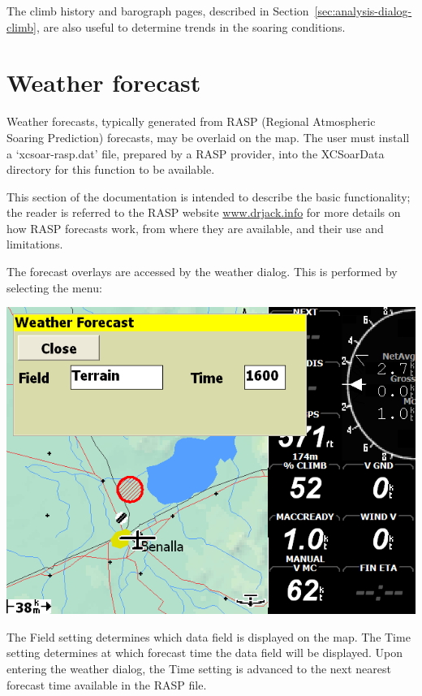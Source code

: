 \documentclass[a4paper,12pt]{refrep}
\begin{document}
The climb history and barograph pages, described in
Section~\ref{sec:analysis-dialog-climb}, are also useful to determine
trends in the soaring conditions.

\section{Weather forecast}

Weather forecasts, typically generated from RASP (Regional Atmospheric
Soaring Prediction) forecasts, may be overlaid on the map.  The user
must install a `xcsoar-rasp.dat' file, prepared by a RASP provider,
into the XCSoarData directory for this function to be available.

This section of the documentation is intended to describe the basic
functionality; the reader is referred to the RASP website
\url{www.drjack.info} for more details on how RASP forecasts work, from where they are available, and their use and limitations.

The forecast overlays are accessed by the weather dialog.  This is
performed by selecting the menu:
\begin{quote}
\blink{}
\end{quote}

\begin{center}
\includegraphics[angle=0,width=\linewidth,keepaspectratio='true']{figures/dialog-weather.png}
\end{center}

The Field setting determines which data field is displayed on the map.
The Time setting determines at which forecast time the data field will
be displayed.  Upon entering the weather dialog, the Time setting is
advanced to the next nearest forecast time available in the RASP file.
\end{document}
